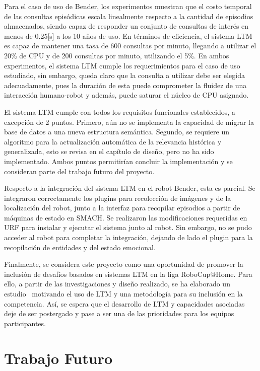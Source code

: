\begin{conclusion}
Para el caso de uso de Bender, los experimentos muestran que el costo temporal de las consultas episódicas escala linealmente respecto a la cantidad de episodios almacenados, siendo capaz de responder un conjunto de consultas de interés en menos de 0.25[s] a los 10 años de uso. En términos de eficiencia, el sistema LTM es capaz de mantener una tasa de 600 consultas por minuto, llegando a utilizar el 20\% de CPU y de 200 consultas por minuto, utilizando el 5\%. En ambos experimentos, el sistema LTM cumple los requerimientos para el caso de uso estudiado, sin embargo, queda claro que la consulta a utilizar debe ser elegida adecuadamente, pues la duración de esta puede comprometer la fluidez de una interacción humano-robot y además, puede saturar el núcleo de CPU asignado.

El sistema LTM cumple con todos los requisitos funcionales establecidos, a excepción de 2 puntos. Primero, aún no se implementa la capacidad de migrar la base de datos a una nueva estructura semántica. Segundo, se requiere un algoritmo para la actualización automática de la relevancia histórica y generalizada, esto se revisa en el capítulo de diseño, pero no ha sido implementado. Ambos puntos permitirían concluir la implementación y se consideran parte del trabajo futuro del proyecto.

Respecto a la integración del sistema LTM en el robot Bender, esta es parcial. Se integraron correctamente los plugins para recolección de imágenes y de la localización del robot, junto a la interfaz para recopilar episodios a partir de máquinas de estado en SMACH. Se realizaron las modificaciones requeridas en URF para instalar y ejecutar el sistema junto al robot. Sin embargo, no se pudo acceder al robot para completar la integración, dejando de lado el plugin para la recopilación de entidades y del estado emocional.

Finalmente, se considera este proyecto como una oportunidad de promover la inclusión de desafíos basados en sistemas LTM en la liga RoboCup@Home. Para ello, a partir de las investigaciones y diseño realizado, se ha elaborado un estudio~\cite{ltm_in_robocup} motivando el uso de LTM y una metodología para su inclusión en la competencia. Así, se espera que el desarrollo de LTM y capacidades asociadas deje de ser postergado y pase a ser una de las prioridades para los equipos participantes.


\section*{Trabajo Futuro}


\end{conclusion}
